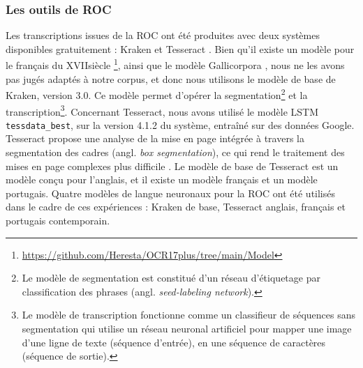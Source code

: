 \subsubsection{Les outils de ROC}
Les transcriptions issues de la ROC ont été produites avec deux systèmes disponibles gratuitement : Kraken \cite{kiessling2019kraken} et Tesseract \cite{smith2007overview}. Bien qu'il existe un modèle pour le français du XVII\ieme{}siècle \cite{gabay:hal-02577236}\footnote{\url{https://github.com/Heresta/OCR17plus/tree/main/Model}}, ainsi que le modèle Gallicorpora \cite{pinche_2022_7410529}, nous ne les avons pas jugés adaptés à notre corpus, et donc nous utilisons le modèle de base de Kraken, version 3.0. Ce modèle permet d'opérer la segmentation\footnote{Le modèle de segmentation est constitué d'un réseau d'étiquetage par classification des phrases (angl. \textit{seed-labeling network}).
} et la transcription\footnote{Le modèle de transcription fonctionne comme un classifieur de séquences sans segmentation qui utilise un réseau neuronal artificiel pour mapper une image d'une ligne de texte (séquence d'entrée), en une séquence de caractères (séquence de sortie). 
}.
 Concernant Tesseract, nous avons utilisé le modèle LSTM \texttt{tessdata\_best}, sur la version 4.1.2 du système, entraîné sur des données Google. Tesseract propose une analyse de la mise en page intégrée à travers la segmentation des cadres (angl. \textit{box segmentation}), ce qui rend le traitement des mises en page complexes plus difficile \cite{reul2017case}. Le modèle de base de Tesseract est un modèle conçu pour l'anglais, et il existe un modèle français et un modèle portugais. Quatre modèles de langue neuronaux pour la ROC ont été utilisés dans le cadre de ces expériences : Kraken de base, Tesseract anglais, français et portugais contemporain.

